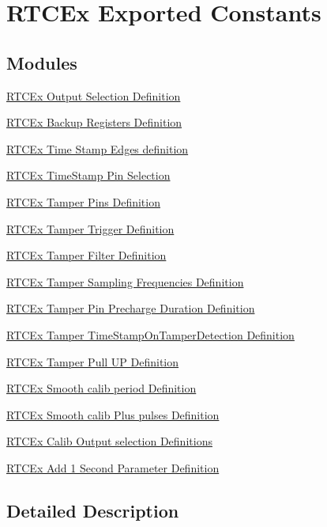 \hypertarget{group___r_t_c_ex___exported___constants}{}\section{R\+T\+C\+Ex Exported Constants}
\label{group___r_t_c_ex___exported___constants}
\subsection*{Modules}
\begin{DoxyCompactItemize}
\item 
\hyperlink{group___r_t_c_ex___output__selection___definitions}{R\+T\+C\+Ex Output Selection Definition}
\item 
\hyperlink{group___r_t_c_ex___backup___registers___definitions}{R\+T\+C\+Ex Backup Registers Definition}
\item 
\hyperlink{group___r_t_c_ex___time___stamp___edges__definitions}{R\+T\+C\+Ex Time Stamp Edges definition}
\item 
\hyperlink{group___r_t_c_ex___time_stamp___pin___selections}{R\+T\+C\+Ex Time\+Stamp Pin Selection}
\item 
\hyperlink{group___r_t_c_ex___tamper___pins___definitions}{R\+T\+C\+Ex Tamper Pins Definition}
\item 
\hyperlink{group___r_t_c_ex___tamper___trigger___definitions}{R\+T\+C\+Ex Tamper Trigger Definition}
\item 
\hyperlink{group___r_t_c_ex___tamper___filter___definitions}{R\+T\+C\+Ex Tamper Filter Definition}
\item 
\hyperlink{group___r_t_c_ex___tamper___sampling___frequencies___definitions}{R\+T\+C\+Ex Tamper Sampling Frequencies Definition}
\item 
\hyperlink{group___r_t_c_ex___tamper___pin___precharge___duration___definitions}{R\+T\+C\+Ex Tamper Pin Precharge Duration Definition}
\item 
\hyperlink{group___r_t_c_ex___tamper___time_stamp_on_tamper_detection___definitions}{R\+T\+C\+Ex Tamper Time\+Stamp\+On\+Tamper\+Detection Definition}
\item 
\hyperlink{group___r_t_c_ex___tamper___pull___u_p___definitions}{R\+T\+C\+Ex Tamper Pull U\+P Definition}
\item 
\hyperlink{group___r_t_c_ex___smooth__calib__period___definitions}{R\+T\+C\+Ex Smooth calib period Definition}
\item 
\hyperlink{group___r_t_c_ex___smooth__calib___plus__pulses___definitions}{R\+T\+C\+Ex Smooth calib Plus pulses Definition}
\item 
\hyperlink{group___r_t_c_ex___calib___output__selection___definitions}{R\+T\+C\+Ex Calib Output selection Definitions}
\item 
\hyperlink{group___r_t_c_ex___add__1___second___parameter___definition}{R\+T\+C\+Ex Add 1 Second Parameter Definition}
\end{DoxyCompactItemize}


\subsection{Detailed Description}
